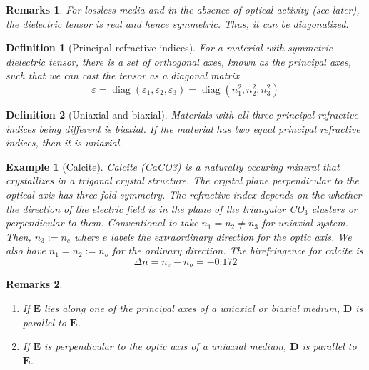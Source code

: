 \documentclass[a4paper]{article}
\DeclareMathOperator{\diag}{diag}
\newtheorem{defi}{Definition}[section]
\newtheorem{remarks}{Remarks}[section]
\newtheorem{eg}{Example}[section]
\theoremstyle{new}
\begin{document}
\begin{remarks}
For lossless media and in the absence of optical activity (see later), the dielectric tensor is real and hence symmetric. Thus, it can be diagonalized.
\end{remarks}
\begin{defi}[Principal refractive indices]
For a material with symmetric dielectric tensor, there is a set of orthogonal axes, known as the principal axes, such that we can cast the tensor as a diagonal matrix.
$$\varepsilon=\diag(\varepsilon_1,\varepsilon_2,\varepsilon_3)=\diag(n_1^2,n_2^2,n_3^2)$$
\end{defi}
\begin{defi}[Uniaxial and biaxial]
Materials with all three principal refractive indices being different is biaxial. If the material has two equal principal refractive indices, then it is uniaxial.
\end{defi}
\begin{eg}[Calcite]
Calcite (CaCO3) is a naturally occuring mineral that crystallizes in a trigonal crystal structure. The crystal plane perpendicular to the optical axis has three-fold symmetry. The refractive index depends on the whether the direction of the electric field is in the plane of the triangular CO$_3$ clusters or perpendicular to them. Conventional to take $n_1=n_2\neq n_3$ for uniaxial system. Then, $n_3:=n_e$ where $e$ labels the extraordinary direction for the optic axis. We also have $n_1=n_2:=n_o$ for the ordinary direction. The birefringence for calcite is
$$\Delta n=n_e-n_o=-0.172$$
\end{eg}
\begin{remarks}\leavevmode
\begin{enumerate}
    \item If $\mathbf{E}$ lies along one of the principal axes of a uniaxial or biaxial medium, $\mathbf{D}$ is parallel to $\mathbf{E}$.
    \item If $\mathbf{E}$ is perpendicular to the optic axis of a uniaxial medium, $\mathbf{D}$ is parallel to $\mathbf{E}$.
\end{enumerate}
\end{remarks}
\end{document}
